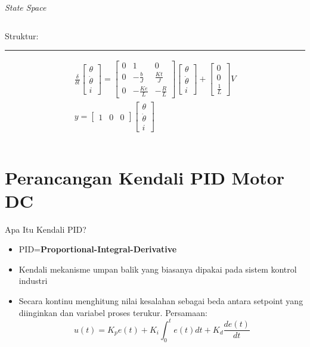 \documentclass[10pt,xcolor={dvipsnames}]{beamer}
\begin{document}
\begin{frame}{\textit{State Space}}
\begin{columns}[T]
\begin{column}{0.5\textwidth}
			Struktur:\newline
			\color{myNewColorA}\rule{\linewidth}{4pt}
			\begin{equation}
				\begin{split}
					\frac{\delta}{\delta t}
					\begin{bmatrix}
						\theta \\ \dot{\theta} \\ i
					\end{bmatrix}
					=
					\begin{bmatrix}
						0 & 1 & 0\\
						0 & -\frac{b}{J} & \frac{Kt}{J}\\
						0 & -\frac{Ke}{L} & -\frac{R}{L}
					\end{bmatrix}
					\begin{bmatrix}
						\theta \\ \dot{\theta} \\ i
					\end{bmatrix}
					+
					\begin{bmatrix}
						0 \\ 0 \\ \frac{1}{L}
					\end{bmatrix}
					V\\
					y=
					\begin{bmatrix}
						1 & 0 & 0
					\end{bmatrix}
					\begin{bmatrix}
						\theta \\ \dot{\theta} \\ i
					\end{bmatrix}
				\end{split}
			\end{equation}
		\end{column}
	\end{columns}
\end{frame}

\section{Perancangan Kendali PID Motor DC}
\begin{frame}{Apa Itu Kendali PID?}
	\begin{itemize}
		\item PID=\textbf{Proportional-Integral-Derivative}
		\item Kendali mekanisme umpan balik yang biasanya dipakai pada sistem kontrol industri
		\item Secara kontinu menghitung nilai kesalahan sebagai beda antara setpoint yang diinginkan dan variabel proses terukur.
		Persamaan:
		\begin{equation}
			u(t)=K_{p}e(t)+K_{i}\int_{0}^{t}e(t)dt+K_{d}\frac{de(t)}{dt}
		\end{equation}
	\end{itemize}
\end{frame}
\end{document}
